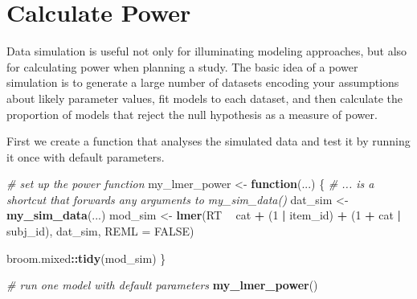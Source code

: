 \documentclass[doc,floatsintext]{apa6}
\newenvironment{Shaded}{\begin{snugshade}}{\end{snugshade}}
\newcommand{\KeywordTok}[1]{\textcolor[rgb]{0.13,0.29,0.53}{\textbf{#1}}}
\newcommand{\DataTypeTok}[1]{\textcolor[rgb]{0.13,0.29,0.53}{#1}}
\newcommand{\DecValTok}[1]{\textcolor[rgb]{0.00,0.00,0.81}{#1}}
\newcommand{\StringTok}[1]{\textcolor[rgb]{0.31,0.60,0.02}{#1}}
\newcommand{\CommentTok}[1]{\textcolor[rgb]{0.56,0.35,0.01}{\textit{#1}}}
\newcommand{\OtherTok}[1]{\textcolor[rgb]{0.56,0.35,0.01}{#1}}
\newcommand{\ControlFlowTok}[1]{\textcolor[rgb]{0.13,0.29,0.53}{\textbf{#1}}}
\newcommand{\OperatorTok}[1]{\textcolor[rgb]{0.81,0.36,0.00}{\textbf{#1}}}
\newcommand{\NormalTok}[1]{#1}
\begin{document}
\section{Calculate Power}\label{calculate-power}

Data simulation is useful not only for illuminating modeling approaches,
but also for calculating power when planning a study. The basic idea of
a power simulation is to generate a large number of datasets encoding
your assumptions about likely parameter values, fit models to each
dataset, and then calculate the proportion of models that reject the
null hypothesis as a measure of power.

First we create a function that analyses the simulated data and test it
by running it once with default parameters.

\begin{Shaded}
\begin{Highlighting}[]
\CommentTok{# set up the power function}
\NormalTok{my_lmer_power <-}\StringTok{ }\ControlFlowTok{function}\NormalTok{(...) \{}
  \CommentTok{# ... is a shortcut that forwards any arguments to my_sim_data()}
\NormalTok{  dat_sim <-}\StringTok{ }\KeywordTok{my_sim_data}\NormalTok{(...)}
\NormalTok{  mod_sim <-}\StringTok{ }\KeywordTok{lmer}\NormalTok{(RT }\OperatorTok{~}\StringTok{ }\NormalTok{cat }\OperatorTok{+}\StringTok{ }\NormalTok{(}\DecValTok{1} \OperatorTok{|}\StringTok{ }\NormalTok{item_id) }\OperatorTok{+}\StringTok{ }\NormalTok{(}\DecValTok{1} \OperatorTok{+}\StringTok{ }\NormalTok{cat }\OperatorTok{|}\StringTok{ }\NormalTok{subj_id),}
\NormalTok{                dat_sim, }\DataTypeTok{REML =} \OtherTok{FALSE}\NormalTok{)}
  
\NormalTok{  broom.mixed}\OperatorTok{::}\KeywordTok{tidy}\NormalTok{(mod_sim)}
\NormalTok{\}}
\end{Highlighting}
\end{Shaded}

\begin{Shaded}
\begin{Highlighting}[]
\CommentTok{# run one model with default parameters}
\KeywordTok{my_lmer_power}\NormalTok{()}
\end{Highlighting}
\end{Shaded}
\end{document}
